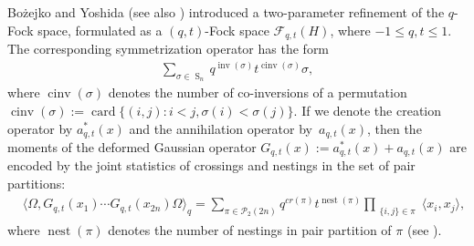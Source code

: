 \documentclass[pdftex]{sigma}
\DeclareMathOperator{\SG}{S}
\numberwithin{equation}{section}
\def\P{\mathcal{P}}
\begin{document}
Bo\.{z}ejko and Yoshida \cite{BozejkoYoshida2006} (see also \cite{Blitvic2012}) introduced a two-parameter refinement of the $q$-Fock space,
formulated as a $(q,t)$-Fock space $\mathcal{F}_{q,t} (H)$, where $-1\leq q, t \leq 1$.
The corresponding symmetrization
operator has the form
\begin{align*}
\sum_{\sigma\in \SG_n}q^{\operatorname{inv}(\sigma)}t^{\operatorname{cinv}(\sigma)}\sigma ,
\end{align*}
where $\operatorname{cinv}(\sigma)$ denotes the number of co-inversions of a permutation $\operatorname{cinv}(\sigma):=\operatorname{card}\{(i,j)\colon {i<j},\allowbreak \sigma(i)<\sigma(j)\}$.
If we denote the creation operator by $a^\ast_{q,t}(x)$ and the annihilation operator by~$a_{q,t}(x)$, then
the moments of
the deformed Gaussian operator $G_{q,t}(x):=a_{q,t}^*(x)+a_{q,t}(x)$ are encoded by the joint statistics of crossings
and nestings in the set of pair partitions:
\begin{equation*}%
	\begin{split}
		&\big\langle\Omega, G_{q,t}(x_1)\cdots G_{q,t}(x_{2n})\Omega\big\rangle_{q}=
		\sum_{\pi\in \P_{2}(2 n)} q^{cr(\pi)}t^{\operatorname{nest}(\pi)} \prod_{\substack{\{i,j\} \in \pi} }\langle x_i,x_j\rangle,
	\end{split}
\end{equation*}
where $\operatorname{nest}(\pi)$ denotes the number of nestings in pair partition of $\pi$ (see \cite[Section 2]{Blitvic2012}).
\end{document}
